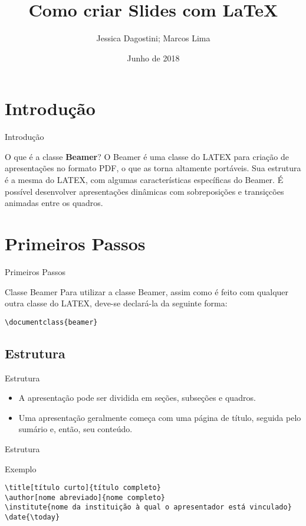 \documentclass{beamer}
\title{Como criar Slides com \LaTeX}
\author{Jessica Dagostini; Marcos Lima}
\date{Junho de 2018}
\begin{document}
\begin{frame}
\titlepage
\end{frame}
	
\section{Introdução}
\begin{frame}{Introdução}
\begin{block}{O que é a classe \textbf{Beamer}?}
\justifying
O Beamer é uma classe do LATEX para criação de apresentações no formato PDF, o que as torna altamente portáveis. 
Sua estrutura é a mesma do LATEX, com algumas características específicas do Beamer.
É possível desenvolver apresentações dinâmicas com sobreposições e transiçcões animadas entre os quadros.
\end{block}
\end{frame}
    
\section{Primeiros Passos}
\begin{frame}[fragile]{Primeiros Passos}
\begin{block}{Classe Beamer}
Para utilizar a classe Beamer, assim como é feito com qualquer outra classe do LATEX, deve-se
declará-la da seguinte forma:
\begin{verbatim}
\documentclass{beamer}
\end{verbatim}
\end{block}
\end{frame}

\subsection{Estrutura}
\begin{frame}{Estrutura}
\begin{itemize}
\item A apresentação pode ser dividida em seções, subseções e quadros.
\item Uma apresentação geralmente começa com uma página de título, seguida pelo sumário e, então, seu conteúdo.
\end{itemize}
\end{frame}

\begin{frame}[fragile]{Estrutura}
\begin{block}{Exemplo}
\begin{verbatim}
\title[título curto]{título completo}
\author[nome abreviado]{nome completo}
\institute{nome da instituição à qual o apresentador está vinculado}
\date{\today}
\end{verbatim}
\end{block}
\end{frame}
\end{document}
